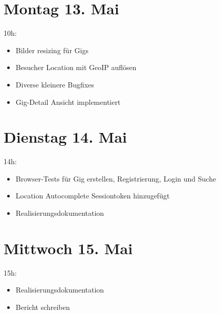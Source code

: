 \section{Montag 13. Mai}\label{montag-13.mai}

10h:

\begin{itemize}
  \tightlist
  \item
        Bilder resizing für Gigs
  \item
        Besucher Location mit GeoIP auflösen
  \item
        Diverse kleinere Bugfixes
  \item
        Gig-Detail Ansicht implementiert
\end{itemize}

\section{Dienstag 14. Mai}\label{dienstag-14.mai}

14h:

\begin{itemize}
  \tightlist
  \item
        Browser-Tests für Gig erstellen, Registrierung, Login und Suche
  \item
        Location Autocomplete Sessiontoken hinzugefügt
  \item
        Realisierungsdokumentation
\end{itemize}

\section{Mittwoch 15. Mai}\label{mittwoch-15.mai}

15h:

\begin{itemize}
  \tightlist
  \item
        Realisierungsdokumentation
  \item
        Bericht schreiben
\end{itemize}
